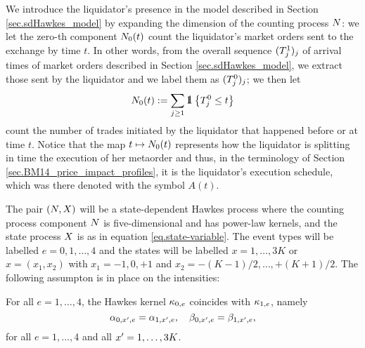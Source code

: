 \documentclass[10pt]{article}
\begin{document}
We introduce the liquidator's presence in the model described in Section \ref{sec.sdHawkes_model} by expanding the dimension of the counting process $\multiCountingProc$: we let the zero-th component $\countingProc[0](t)$ count the liquidator's market orders sent to the exchange by time $t$. In other words, from the overall sequence $(\arrivalTimes[1]_j)_j$ of arrival times of market orders described in Section \ref{sec.sdHawkes_model}, we extract those sent by the liquidator and we label them as $(\arrivalTimes[0]_j)_j$; we then let 
\begin{equation*}
 \countingProc[0](t):=\sum_{j\geq 1}\one \left\lbrace \arrivalTimes[0]_j \leq t \right\rbrace
\end{equation*}
count the number of trades initiated by the liquidator that happened before or at time $t$. Notice that the map $t\mapsto \countingProc[0](t)$ represents how the liquidator is splitting in time the execution of her metaorder and thus, in the terminology of Section \ref{sec.BM14_price_impact_profiles}, it is the liquidator's execution schedule, which was there denoted with the symbol $A(t)$.

The pair $(\multiCountingProc, \stateVariable)$ will be a state-dependent Hawkes process where the counting process component $\multiCountingProc$ is five-dimensional and has power-law kernels, and the state process $\stateVariable$ is as in equation \eqref{eq.state-variable}. The event types will be labelled $e=0,1,\dots,4$ and the states will be labelled $x=1,\dots,3K$ or $x=(x_1,x_2)$ with $x_1 = -1,0,+1$ and $x_2 = -(K-1)/2,\dots,+(K+1)/2$.  The following assumpton is in place on the intensities:
\begin{assumption}\label{assumption.imp_and_dec_coef_from_liquidator}
 For all $e=1,\dots,4$, the Hawkes kernel $\hawkesKernel_{0,e}$ coincides with  $\hawkesKernel_{1,e}$, namely
 \begin{equation*}
  \impCoef_{0,\xone,e}=\impCoef_{1,\xone,e} , \quad \decCoef_{0,\xone,e}= \decCoef_{1,\xone,e}, 
 \end{equation*}
for all $e=1,\dots,4$ and all $\xone = 1,\dots, 3K$. 
\end{assumption}
\end{document}
